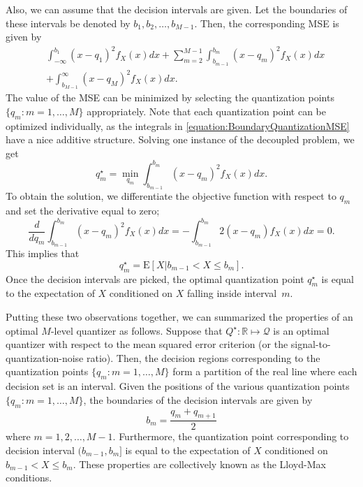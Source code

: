 Also, we can assume that the decision intervals are given.
Let the boundaries of these intervals be denoted by $b_1, b_2, \ldots, b_{M-1}$.
Then, the corresponding MSE is given by
\begin{equation} \label{equation:BoundaryQuantizationMSE}
\begin{split}
&\int_{-\infty}^{b_1} (x - q_1)^2 f_X(x) dx
+ \sum_{m=2}^{M-1}
\int_{b_{m-1}}^{b_m} (x - q_m)^2 f_X(x) dx \\
&+ \int_{b_{M-1}}^{\infty} (x - q_M)^2 f_X(x) dx .
\end{split}
\end{equation}
The value of the MSE can be minimized by selecting the quantization points $\{ q_m : m = 1, \ldots, M \}$ appropriately.
Note that each quantization point can be optimized individually, as the integrals in \eqref{equation:BoundaryQuantizationMSE} have a nice additive structure.
Solving one instance of the decoupled problem, we get
\begin{equation*}
q_m^{\star} = \min_{q_m} \int_{b_{m-1}}^{b_m} (x - q_m)^2 f_X(x) dx .
\end{equation*}
To obtain the solution, we differentiate the objective function with respect to $q_m$ and set the derivative equal to zero;
\begin{equation*}
\frac{d}{d q_m} \int_{b_{m-1}}^{b_m} (x - q_m)^2 f_X(x) dx
= - \int_{b_{m-1}}^{b_m} 2 (x - q_m) f_X(x) dx = 0 .
\end{equation*}
This implies that
\begin{equation*}
q_m^{\star} = \mathrm{E} [ X | b_{m-1} < X \leq b_m ] .
\end{equation*}
Once the decision intervals are picked, the optimal quantization point $q_m^{\star}$ is equal to the expectation of $X$ conditioned on $X$ falling inside interval~$m$.

Putting these two observations together, we can summarized the properties of an optimal $M$-level quantizer as follows.
Suppose that $Q^{\star} : \mathbb{R} \mapsto \mathcal{Q}$ is an optimal quantizer with respect to the mean squared error criterion (or the signal-to-quantization-noise ratio).
Then, the decision regions corresponding to the quantization points $\{ q_m : m = 1, \ldots, M \}$ form a partition of the real line where each decision set is an interval.
Given the positions of the various quantization points $\{ q_m : m = 1, \ldots, M \}$, the boundaries of the decision intervals are given by
\begin{equation*}
b_m = \frac{q_m + q_{m+1}}{2}
\end{equation*}
where $m = 1, 2, \ldots, M-1$.
Furthermore, the quantization point corresponding to decision interval $(b_{m-1}, b_m]$ is equal to the expectation of $X$ conditioned on $b_{m-1} < X \leq b_m$.
These properties are collectively known as the Lloyd-Max conditions.


